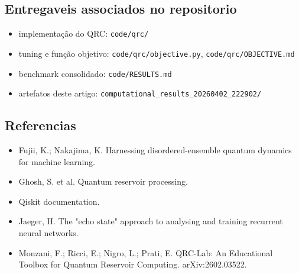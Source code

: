 \documentclass[12pt]{article}
\providecommand{\tightlist}{%
          \setlength{\itemsep}{0pt}\setlength{\parskip}{0pt}}
\begin{document}
\subsection{Entregaveis associados no repositorio}\label{entregaveis-associados-no-repositorio}

\begin{itemize}
\tightlist
\item
  implementação do QRC: \texttt{code/qrc/}
\item
  tuning e função objetivo: \texttt{code/qrc/objective.py}, \texttt{code/qrc/OBJECTIVE.md}
\item
  benchmark consolidado: \texttt{code/RESULTS.md}
\item
  artefatos deste artigo: \texttt{computational\_results\_20260402\_222902/}
\end{itemize}

\subsection{Referencias}\label{referencias}

\begin{itemize}
\tightlist
\item
  Fujii, K.; Nakajima, K. Harnessing disordered-ensemble quantum dynamics for machine learning.
\item
  Ghosh, S. et al. Quantum reservoir processing.
\item
  Qiskit documentation.
\item
  Jaeger, H. The "echo state" approach to analysing and training recurrent neural networks.
\item
  Monzani, F.; Ricci, E.; Nigro, L.; Prati, E. QRC-Lab: An Educational Toolbox for Quantum Reservoir Computing. arXiv:2602.03522.
\end{itemize}

        
\end{document}
